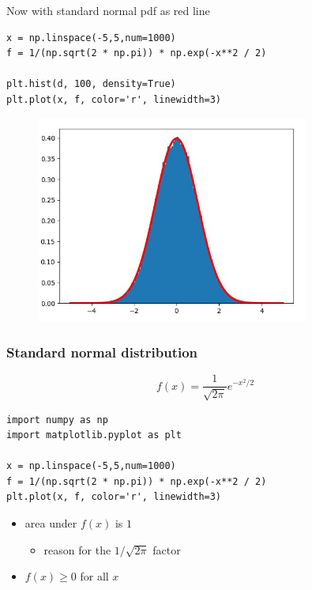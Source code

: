 \documentclass[english,14pt]{beamer}
\begin{document}

\begin{frame}[fragile]

\frametitle{}

Now with standard normal pdf as red line

\begin{lstlisting}[style=CStyle,basicstyle=\scriptsize]
x = np.linspace(-5,5,num=1000)
f = 1/(np.sqrt(2 * np.pi)) * np.exp(-x**2 / 2)

plt.hist(d, 100, density=True)
plt.plot(x, f, color='r', linewidth=3)
\end{lstlisting}

\begin{figure}[ht]
	\centering
	\includegraphics[width=0.8\textwidth]{figures/histWithpdf}
\end{figure}

\end{frame}


\begin{frame}[fragile]

\frametitle{Standard normal distribution}

\[
f(x) = \frac{1}{\sqrt{2\pi}} e^{-x^2/2}
\]

\begin{lstlisting}[style=CStyle,basicstyle=\scriptsize]
import numpy as np
import matplotlib.pyplot as plt

x = np.linspace(-5,5,num=1000)
f = 1/(np.sqrt(2 * np.pi)) * np.exp(-x**2 / 2)
plt.plot(x, f, color='r', linewidth=3)
\end{lstlisting}

\begin{itemize}
	\item area under $f(x)$ is $1$
	\begin{itemize}
		\item reason for the $1/\sqrt{2\pi}$ factor
	\end{itemize}
	
	\item $f(x) \geq 0$ for all $x$
\end{itemize}

\end{frame}
\end{document}
